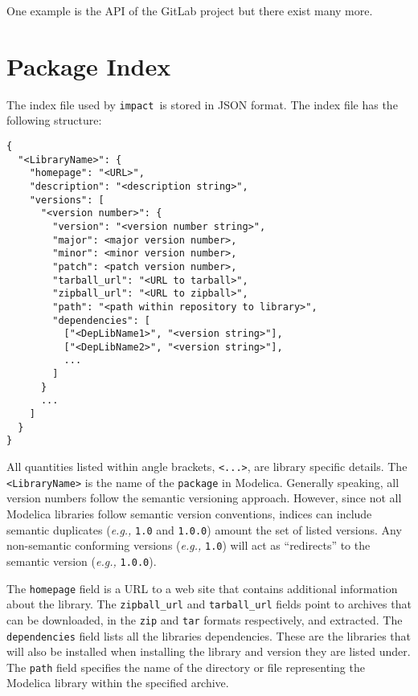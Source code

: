 \documentclass[11pt,a4paper,twocolumn]{article}
\newcommand{\impact}{\texttt{impact}} %
\newcommand{\code}[1]{\texttt{#1}} %
\begin{document}
One example is the API of the GitLab project\cite{gl-api} but there exist
many more.









\section{Package Index}
\label{sec:index}



The index file used by \impact\ is stored in JSON format.  The index file
has the following structure:

{\footnotesize
\begin{verbatim}
{
  "<LibraryName>": {
    "homepage": "<URL>",
    "description": "<description string>",
    "versions": [
      "<version number>": {
        "version": "<version number string>",
        "major": <major version number>,
        "minor": <minor version number>,
        "patch": <patch version number>,
        "tarball_url": "<URL to tarball>",
        "zipball_url": "<URL to zipball>",
        "path": "<path within repository to library>",
        "dependencies": [
          ["<DepLibName1>", "<version string>"],
          ["<DepLibName2>", "<version string>"],
          ...
        ]
      }
      ...
    ]
  }
}
\end{verbatim}
}

All quantities listed within angle brackets, \code{<...>}, are library
specific details.  The \code{<LibraryName>} is the name of the
\code{package} in Modelica.  Generally speaking, all version numbers
follow the semantic versioning approach.  However, since not all
Modelica libraries follow semantic version conventions, indices can
include semantic duplicates (\textit{e.g.,} \code{1.0} and
\code{1.0.0}) amount the set of listed versions.  Any non-semantic
conforming versions (\textit{e.g.,} \code{1.0}) will act as
``redirects'' to the semantic version (\textit{e.g.,} \code{1.0.0}).

The \code{homepage} field is a URL to a web site that contains
additional information about the library.  The \code{zipball\_url} and
\code{tarball\_url} fields point to archives that can be downloaded,
in the \code{zip} and \code{tar} formats respectively, and extracted.
The \code{dependencies} field lists all the libraries dependencies.
These are the libraries that will also be installed when installing
the library and version they are listed under.  The \code{path} field
specifies the name of the directory or file representing the Modelica
library within the specified archive.
\end{document}
